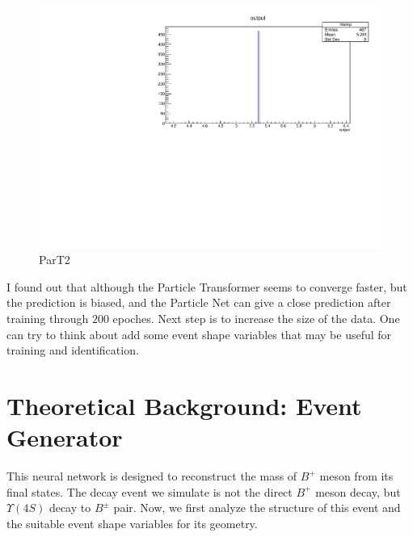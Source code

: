 \documentclass[12pt]{article}
\numberwithin{equation}{section}
\begin{document}
\begin{figure}[H]
    \centering
    \includegraphics[width=0.5\linewidth]{figures/predParT2.pdf}
    \caption{ParT2}
    \label{ParT2}
\end{figure}

I found out that although the Particle Transformer seems to converge faster, but the prediction is biased, and the Particle Net can give a close prediction after training through $200$ epoches.
Next step is to increase the size of the data.
One can try to think about add some event shape variables that may be useful for training and identification.

\section{Theoretical Background: Event Generator}
This neural network is designed to reconstruct the mass of \(B^{+}\) meson from its final states.
The decay event we simulate is not the direct \(B^{+}\) meson decay, but \( \Upsilon ( 4S ) \) decay to \( B^{\pm} \) pair.
Now, we first analyze the structure of this event and the suitable event shape variables for its geometry.
\end{document}
